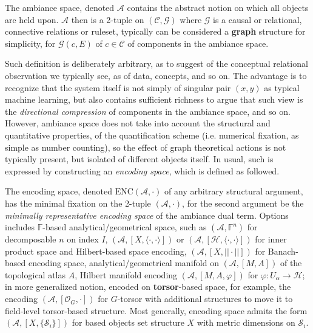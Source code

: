 \begin{definition}
  The ambiance space, denoted $\mathcal{A}$ contains the abstract notion on which all objects are held upon. $\mathcal{A}$ then is a 2-tuple on $(\mathcal{C},\mathcal{G})$ where $\mathcal{G}$ is a causal or relational, connective relations or ruleset, typically can be considered a \textbf{graph} structure for simplicity, for $\mathcal{G}(c,E)$ of $c\in\mathcal{C}$ of components in the ambiance space. 
\end{definition}
Such definition is deliberately arbitrary, as to suggest of the conceptual relational observation we typically see, as of data, concepts, and so on. The advantage is to recognize that the system itself is not simply of singular pair $(x,y)$ as typical machine learning, but also contains sufficient richness to argue that such view is the \textit{directional compression} of components in the ambiance space, and so on. However, ambiance space does not take into account the structural and quantitative properties, of the quantification scheme (i.e. numerical fixation, as simple as number counting), so the effect of graph theoretical actions is not typically present, but isolated of different objects itself. In usual, such is expressed by constructing an \textit{encoding space}, which is defined as followed.  
\begin{definition}
  The encoding space, denoted $\mathrm{ENC}(\mathcal{A},\cdot)$ of any arbitrary structural argument, has the minimal fixation on the 2-tuple $(\mathcal{A},\cdot)$, for the second argument be the \textit{minimally representative encoding space} of the ambiance dual term. Options includes $\mathbb{F}$-based analytical/geometrical space, such as $(\mathcal{A},\mathbb{F}^{n})$ for decomposable $n$ on index $I$, $(\mathcal{A},[X,\langle\cdot,\cdot\rangle])$ or $(\mathcal{A},[\mathcal{H},\langle\cdot,\cdot\rangle])$ for inner product space and Hilbert-based space encoding, $(\mathcal{A},[X,||\cdot||])$ for Banach-based encoding space, analytical/geometrical manifold on $(\mathcal{A},[M,A])$ of the topological atlas $A$, Hilbert manifold encoding $(\mathcal{A},[M,A,\varphi])$ for $\varphi:U_{\alpha}\to\mathcal{H}$; in more generalized notion, encoded on \textbf{torsor}-based space, for example, the encoding $(\mathcal{A},[\mathcal{O}_{G},\cdot])$ for $G$-torsor with additional structures to move it to field-level torsor-based structure. Most generally, encoding space admits the form $(\mathcal{A},[X,\{\mathcal{S}_{i}\}])$ for based objects set structure $X$ with metric dimensions on $\mathcal{S}_{i}$. 
\end{definition}


